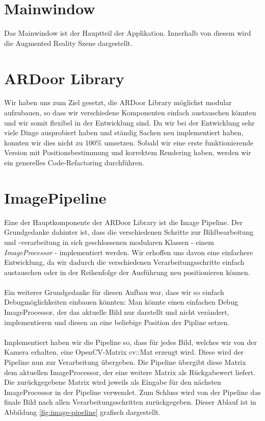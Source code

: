 \section{Mainwindow}
Das Mainwindow ist der Hauptteil der Applikation. Innerhalb von diesem wird die Augmented Reality Szene dargestellt.

\section{ARDoor Library}
Wir haben uns zum Ziel gesetzt, die ARDoor Library möglichst modular aufzubauen, so dass wir verschiedene Komponenten einfach austauschen könnten und wir somit flexibel in der Entwicklung sind. Da wir bei der Entwicklung sehr viele Dinge ausprobiert haben und ständig Sachen neu implementiert haben, konnten wir dies nicht zu 100\% umsetzen. Sobald wir eine erste funktionierende Version mit Positionsbestimmung und korrektem Rendering haben, werden wir ein generelles Code-Refactoring durchführen.

\section{ImagePipeline}
Eine der Hauptkomponente der ARDoor Library ist die Image Pipeline. Der Grundgedanke dahinter ist, dass die verschiedenen Schritte zur Bildbearbeitung und -verarbeitung in sich geschlossenen modularen Klassen - einem \textit{ImageProcessor} - implementiert werden. Wir erhoffen uns davon eine einfachere Entwicklung, da wir dadurch die verschiedenen Verarbeitungsschritte einfach austauschen oder in der Reihenfolge der Ausführung neu positionieren können.

\paragraph{}
Ein weiterer Grundgedanke für diesen Aufbau war, dass wir so einfach Debugmöglichkeiten einbauen könnten: Man könnte einen einfachen Debug ImageProcessor, der das aktuelle Bild nur darstellt und nicht verändert, implementieren und diesen an eine beliebige Position der Pipline setzen.

\paragraph{}
Implementiert haben wir die Pipeline so, dass für jedes Bild, welches wir von der Kamera erhalten, eine OpenCV-Matrix cv::Mat erzeugt wird. Diese wird der Pipeline nun zur Verarbeitung übergeben. Die Pipeline übergibt diese Matrix dem aktuellen ImageProcessor, der eine weitere Matrix als Rückgabewert liefert. Die zurückgegebene Matrix wird jeweils als Eingabe für den nächsten ImageProcessor in der Pipeline verwendet. Zum Schluss wird von der Pipeline das finale Bild nach allen Verarbeitungsschritten zurückgegeben. Dieser Ablauf ist in Abbildung \ref{fig:image-pipeline} grafisch dargestellt.

